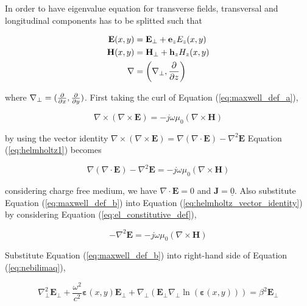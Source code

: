 \documentclass[thesis]{deutez}
\begin{document}
    In order to have eigenvalue equation for transverse fields, transversal and longitudinal components has to be splitted such that

    \begin{subequations}\label{eq:trans-longi_splitting}
        \begin{align}
            \mathbf{E}(x,y) &= \mathbf{E_{\perp}} + \mathbf{e}_z E_z(x,y) \label{eq:splitting_e} \\
            \mathbf{H}(x,y) &= \mathbf{H_{\perp}} + \mathbf{h}_z H_z(x,y) \label{eq:splitting_h} \\
             \mathbf{\nabla} &= \left( \nabla_{\perp}, \pdv{}{z} \right) 
        \end{align}
    \end{subequations}

    where $\nabla_{\perp} = (\pdv{}{x},\pdv{}{y}) $. First taking the curl of Equation (\ref{eq:maxwell_def_a}), 

    \begin{equation}
        \nabla \times (\nabla \times \mathbf{E}) = -j\omega \mu_0  (\nabla \times \mathbf{H})
        \label{eq:helmholtz1}
    \end{equation}

    by using the vector identity $\nabla \times (\nabla \times \mathbf{E}) = \nabla(\nabla \cdot \mathbf{E}) - \nabla^2 \mathbf{E}$ Equation (\ref{eq:helmholtz1}) becomes 

    \begin{equation}
        \nabla(\nabla \cdot \mathbf{E}) - \nabla^2 \mathbf{E} = -j\omega\mu_0 (\nabla \times \mathbf{H})
        \label{eq:helmholtz_vector_identity}
    \end{equation}

    considering charge free medium, we have $\nabla \cdot \mathbf{E}=0$ and $\mathbf{J}=\underline{0}$. Also substitute Equation (\ref{eq:maxwell_def_b}) into  Equation (\ref{eq:helmholtz_vector_identity}) by considering  Equation (\ref{eq:el_constitutive_def}),

    \begin{equation}
        - \nabla^2 \mathbf{E} = -j\omega\mu_0 (\nabla \times \mathbf{H})
        \label{eq:nebilimaq}
    \end{equation}
    
    Substitute Equation (\ref{eq:maxwell_def_b}) into right-hand side of Equation (\ref{eq:nebilimaq}),

    \begin{equation}
        \nabla_{\perp}^2 \mathbf{E}_{\perp} + \frac{\omega^2}{c^2}\bm{\varepsilon}(x,y) \mathbf{E}_{\perp} + \nabla_{\perp} (\mathbf{E}_{\perp} \nabla_{\perp} \ln(\bm{\varepsilon}(x,y)) ) = \beta^2 \mathbf{E}_{\perp}
        \label{eq:tranversal_eigenval}
    \end{equation}
    
\end{document}
